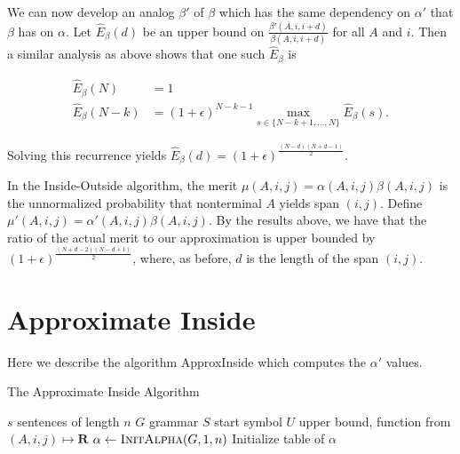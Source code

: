 \documentclass{article}
\begin{document}
We can now develop an analog $\beta'$ of $\beta$ which has the same
dependency on $\alpha'$ that $\beta$ has on $\alpha$. Let
$\hat{E}_{\beta}(d)$ be an upper bound on $\frac{\beta'(A, i,
  i+d)}{\beta(A, i, i+d)}$ for all $A$ and $i$. Then a similar
analysis as above shows that one such $\hat{E}_\beta$ is

\begin{align}
\hat{E}_{\beta}(N) &= 1\\
\hat{E}_{\beta}(N-k) &= (1+\epsilon)^{N-k-1} \max_{s \in \{N-k+1, \dots, N\}} \hat{E}_{\beta}(s).
\end{align}

Solving this recurrence yields $\hat{E}_{\beta}(d) = (1+\epsilon)^{\frac{(N-d)(N+d-1)}{2}}$.

In the Inside-Outside algorithm, the merit $\mu(A, i, j) = \alpha(A,
i, j) \beta(A, i, j)$ is the unnormalized probability that nonterminal
$A$ yields span $(i, j)$. Define $\mu'(A, i, j) = \alpha'(A, i, j)
\beta(A, i, j)$. By the results above, we have that the ratio of the
actual merit to our approximation is upper bounded by
$(1+\epsilon)^{\frac{(N+d-2)(N-d+1)}{2}}$, where, as before, $d$ is
the length of the span $(i, j)$.


\section{Approximate Inside}
Here we describe the algorithm ApproxInside which computes the
$\alpha'$ values.


\begin{algorithm}
\caption{The Approximate Inside Algorithm \label{alg:approxInside}}
\begin{algorithmic}[1]
  \State \Comment $s$ sentences of length $n$
  \State \Comment $G$ grammar 
  \State \Comment $S$ start symbol
  \State \Comment $U$ upper bound, function from $(A, i, j) \mapsto \mathbf{R}$
  \State $\alpha \leftarrow \Call{InitAlpha}{G, 1, n}$ \Comment Initialize table of $\alpha$ 
  \State \Return {}
\EndProcedure
\end{algorithmic}
\end{algorithm}
\end{document}
